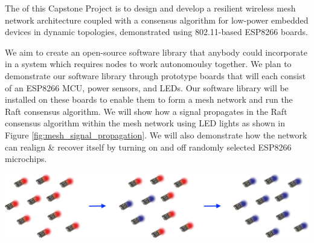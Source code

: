 The of this Capstone Project is to design and develop a resilient wireless mesh network architecture coupled with a consensus algorithm for low-power embedded devices in dynamic topologies, demonstrated using 802.11-based ESP8266 boards.

We aim to create an open-source software library that anybody could incorporate in a system which requires nodes to work autonomoulsy together. We plan to demonstrate our software library through prototype boards that will each consist of an ESP8266 MCU, power sensors, and LEDs. Our software library will be installed on these boards to enable them to form a mesh network and run the Raft consensus algorithm. We will show how a signal propagates in the Raft consensus algorithm within the mesh network using LED lights as shown in Figure \ref{fig:mesh_signal_propagation}. We will also demonstrate how the network can realign \& recover itself by turning on and off randomly selected ESP8266 microchips.

\begingroup
    \centering
    \medskip
    \includegraphics[width=\columnwidth]{final-proposal/images/mesh_signal_propagation.png}
    \label{fig:mesh_signal_propagation}
\endgroup